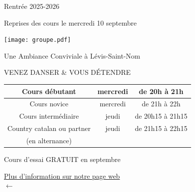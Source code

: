 \documentclass[12pt,a4paper]{article}
\newcommand{\logo}{\makebox[56mm][c]{\rule{0mm}{66mm}\raisebox{12mm}{\texttt{[image: logo/aldc-4couleurs-3.pdf]}}}}
\begin{document}

\vspace*{-20mm}\hspace*{-15mm}



\begin{center}

\bfseries
\color{orange!75!black}

\LARGE

Rentrée 2025-2026

 Reprises des cours le mercredi 10 septembre

\vfill

\texttt{[image: groupe.pdf]}

\color{green!50!black}%
Une Ambiance Conviviale à Lévis-Saint-Nom

\color{blue!50!black}%
VENEZ DANSER \& VOUS DÉTENDRE

\vfill

\large
\setlength\arrayrulewidth{2pt}
\color{brown!50!black}
\begin{tabular}{|c|c|c|}
  \hline
  \rowcolor{orange!10}
  Cours débutant & mercredi & de 20h à 21h \\
  \hline
  \rowcolor{orange!20}
  Cours novice & mercredi & de 21h à 22h \\
  \hline
  \rowcolor{orange!30}
  Cours intermédiaire & jeudi & de 20h15 à 21h15 \\
  \hline
  \rowcolor{green!20}%
  \color{green!25!black}%
  Country catalan ou partner & jeudi & de 21h15 à 22h15 \\
  \rowcolor{green!20}%
  \color{green!25!black}%
  (en alternance) &  &  \\
  \hline
\end{tabular}
\vfill

\Large

\color{red!70!black}%
Cours d'essai GRATUIT en septembre

\vfill

\href{https://alevisdanse.github.io}{}
\qquad
\begin{minipage}[c]{0.45\textwidth}
  \Huge\color{black!50!blue}  \href{https://alevisdanse.github.io}{Plus d'information sur notre page web \\
    $\longleftarrow$}
\end{minipage}

\end{center}
\end{document}
